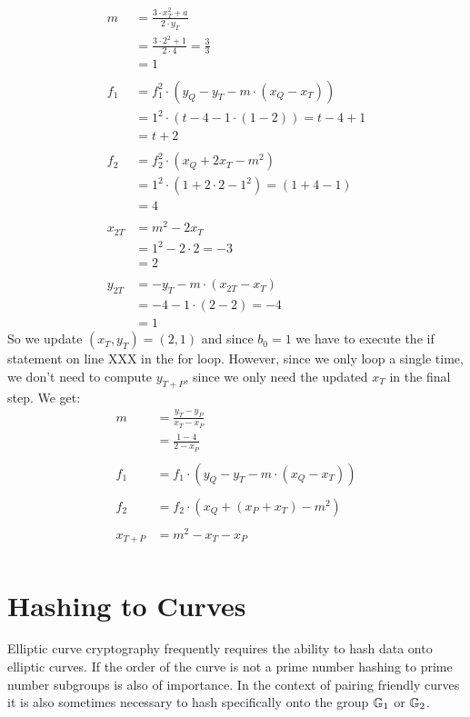 \begin{example}
\begin{align*}
m & = \frac{3\cdot x_T^2 +a}{2\cdot y_T}\\
  & = \frac{3\cdot 2^2 +1}{2\cdot 4}
    = \frac{3}{3}\\
  & = 1\\
  \\
f_1 & = f_1^2\cdot (y_Q - y_T - m\cdot(x_Q-x_T)) \\
    & = 1^2\cdot (t - 4 - 1\cdot(1-2))
      = t-4+1\\
    & = t+2\\
    \\
f_2 & =  f_2^2\cdot (x_Q + 2x_T -m^2)\\
    & = 1^2\cdot (1 + 2\cdot 2 -1^2)
      = (1 + 4 -1)\\
    & = 4\\
\\  
x_{2T} & =  m^2 - 2 x_T\\
       & =  1^2 - 2\cdot 2
         = -3\\
       & = 2 \\  
\\
y_{2T} & = -y_T - m\cdot (x_{2T}-x_T)\\
       & = -4 - 1\cdot (2-2)
         = -4\\
       & = 1
\end{align*}
So we update $(x_T,y_T) =(2,1)$ and since $b_0=1$ we have to execute the if statement on line XXX in the for loop. However, since we only loop a single time, we don't need to compute $y_{T+P}$, since we only need the updated $x_T$ in the final step. We get:
\begin{align*}
m & =  \frac{y_T -y_P}{x_T - x_P}\\
  & =  \frac{1 -4}{2 - x_P}\\
\\
f_1 & = f_1\cdot (y_Q -y_T -m\cdot (x_Q - x_T))\\
\\
f_2 & = f_2\cdot (x_Q + (x_P+x_T) - m^2)\\
\\
x_{T+P} & = m^2 -x_T -x_P\\
\end{align*}
\end{example}


\section{Hashing to Curves} Elliptic curve cryptography frequently requires the ability to hash data onto elliptic curves. If the order of the curve is not a prime number hashing to prime number subgroups is also of importance. In the context of pairing friendly curves it is also sometimes necessary to hash specifically onto the group $\mathbb{G}_1$ or $\mathbb{G}_2$.

